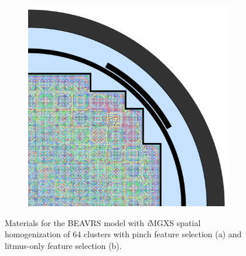 \begin{figure}[h!]
\begin{subfigure}{0.67\textwidth}
  \includegraphics[width=\linewidth]{figures/unsupervised/geometries/with-features/64-clusters/combined/full-core}
  \caption{}
  \label{fig:chap10-full-core-combined-64}
\end{subfigure}
\caption[Clustered geometries for BEAVRS]{Materials for the \ac{BEAVRS} model with \textit{i}\ac{MGXS} spatial homogenization of 64 clusters with pinch feature selection (a) and litmus-only feature selection (b).}
\label{fig:chap10-full-core-geometries-64}
\end{figure}

\clearpage

